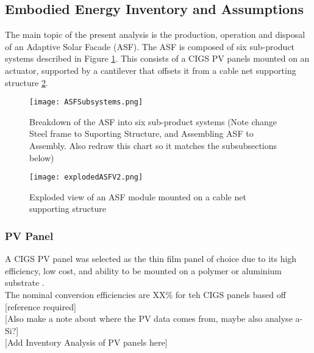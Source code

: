 
\subsection{Embodied Energy Inventory and Assumptions}

The main topic of the present analysis is the production, operation and disposal of an Adaptive Solar Facade (ASF). The ASF is composed of six sub-product systems described in Figure \ref{fig:subsystem}. This consists of a CIGS PV panels mounted on an actuator, supported by a cantilever that offsets it from a cable net supporting structure \ref{fig:explodedView}.

\begin{figure}[H]
\begin{center}
\texttt{[image: ASFSubsystems.png]}
\caption{Breakdown of the ASF into six sub-product systems (Note change Steel frame to Suporting Structure, and Assembling ASF to Assembly. Also redraw this chart so it matches the subsubsections below)}
\label{fig:subsystem}
\end{center}
\end{figure}

\begin{figure}[H]
\begin{center}
\texttt{[image: explodedASFV2.png]}
\caption{Exploded view of an ASF module mounted on a cable net supporting structure}
\label{fig:explodedView}
\end{center}
\end{figure}

\subsubsection*{PV Panel}
A CIGS PV panel was selected as the thin film panel of choice due to its high efficiency, low cost, and ability to be mounted on a polymer or aluminium substrate \cite{chirilua2011highly}.\\

The nominal conversion efficiencies are XX\% for teh CIGS panels based off [reference required]\\

[Also make a note about where the PV data comes from, maybe also analyse a-Si?]\\

[Add Inventory Analysis of PV panels here]

